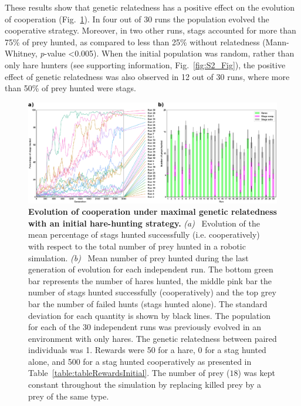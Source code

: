     These results show that genetic relatedness has a positive effect on the evolution of cooperation (Fig.~\ref{fig:graphAltruism}). In four out of 30 runs the population evolved the cooperative strategy. Moreover, in two other runs, stags accounted for more than 75\% of prey hunted, as compared to less than 25\% without relatedness (Mann-Whitney, {\em p}-value \textless 0.005). When the initial population was random, rather than only hare hunters (see supporting information, Fig.~\ref{fig:S2_Fig}), the positive effect of genetic relatedness was also observed in 12 out of 30 runs, where more than 50\% of prey hunted were stags.

    \begin{figure}[h]
      \centerfloat
        \includegraphics[scale = 0.9]{fig/ArticleBio1/Fig7.eps}
      \caption{\textbf{Evolution of cooperation under maximal genetic relatedness with an initial hare-hunting strategy.} 
      {\em (a)}~ Evolution of the mean percentage of stags hunted successfully (i.e. cooperatively) with respect to the total number of prey hunted in a robotic simulation. {\em (b)}~ Mean number of prey hunted during the last generation of evolution for each independent run. The bottom green bar represents the number of hares hunted, the middle pink bar the number of stags hunted successfully (cooperatively) and the top grey bar the number of failed hunts (stags hunted alone). The standard deviation for each quantity is shown by black lines. The population for each of the 30 independent runs was previously evolved in an environment with only hares. The genetic relatedness between paired individuals was 1. Rewards were 50 for a hare, 0 for a stag hunted alone, and 500 for a stag hunted cooperatively as presented in Table~\ref{table:tableRewardsInitial}. The number of prey ($18$) was kept constant throughout the simulation by replacing killed prey by a prey of the same type.}
      \label{fig:graphAltruism}
    \end{figure}

